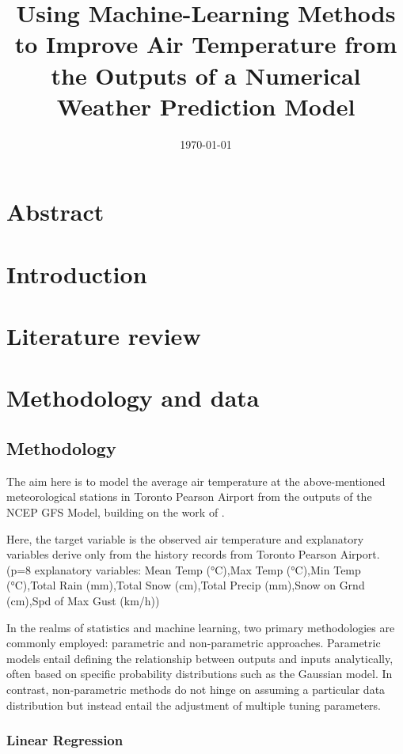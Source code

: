 \documentclass[12pt]{article}
\title{Using Machine-Learning Methods to Improve Air Temperature from the Outputs of a Numerical Weather Prediction
Model}
\date{\today}
\begin{document}
	
\maketitle
	
\section*{Abstract}
\section{Introduction}
\section{Literature review}
\cite{Goutham2021}
\cite{Hou2022}
\cite{Zampieri2023}
\section{Methodology and data}

\subsection{Methodology}

The aim here is to model the average air temperature at the above-mentioned meteorological stations in Toronto Pearson Airport from the outputs of the NCEP GFS Model, building on the work of \cite{Goutham2021}.

Here, the target variable is the observed air temperature and explanatory variables derive only from the history records from Toronto Pearson Airport. (p=8 explanatory variables: Mean Temp (°C),Max Temp (°C),Min Temp (°C),Total Rain (mm),Total Snow (cm),Total Precip (mm),Snow on Grnd (cm),Spd of Max Gust (km/h))

In the realms of statistics and machine learning, two primary methodologies are commonly employed: parametric and non-parametric approaches. Parametric models entail defining the relationship between outputs and inputs analytically, often based on specific probability distributions such as the Gaussian model. In contrast, non-parametric methods do not hinge on assuming a particular data distribution but instead entail the adjustment of multiple tuning parameters.

\subsubsection{Linear Regression}
\end{document}
